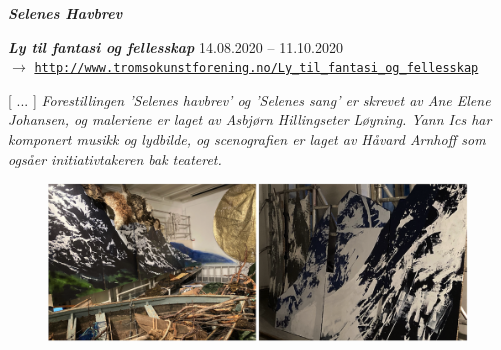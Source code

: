 \newpage 

{\Large \textsl{\textbf{Selenes Havbrev}}}

\bigskip

\noindent \textbf{\textsl{Ly til fantasi og fellesskap}} 14.08.2020 -- 11.10.2020 \vspace{1mm} \\ 
$\rightarrow$ \href{http://www.tromsokunstforening.no/default.asp?cmd=100&UtsID=200}{\texttt{\footnotesize http://www.tromsokunstforening.no/Ly\_til\_fantasi\_og\_fellesskap}} 

\bigskip

[ ... ] \textsl{Forestillingen 'Selenes havbrev' og 'Selenes sang' er skrevet av Ane Elene Johansen, og maleriene er laget av Asbj\o{}rn Hillingseter L\o{}yning. Yann Ics har komponert musikk og lydbilde, og scenografien er laget av H\aa vard Arnhoff som ogs\aa  er initiativtakeren bak teateret.}

\smallskip

\begin{figure}[h]
	\begin{center}
		\includegraphics[width=0.99\textwidth]{mp/img/img2}
		\label{sh}
	\end{center}
\end{figure}

